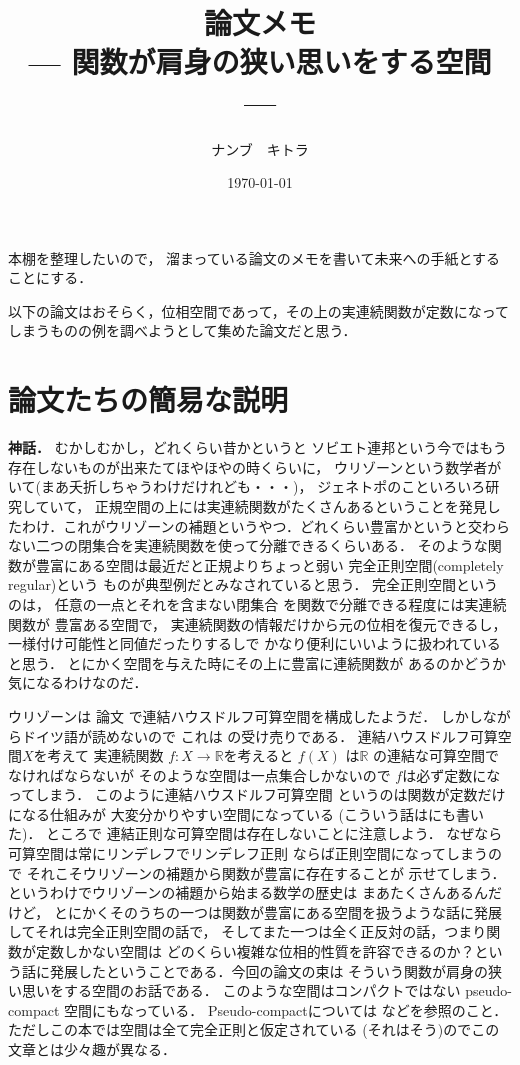 \documentclass[leqno, a4paper, 12pt]{jsarticle}
\title{論文メモ
\large{\\--- 関数が肩身の狭い思いをする空間 ---}
}
\author{ナンブ　キトラ}
\date{\today}
\newcommand{\rr}{\mathbb{R}}
\begin{document}
\maketitle

本棚を整理したいので，
溜まっている論文のメモを書いて未来への手紙とすることにする．

以下の論文はおそらく，位相空間であって，その上の実連続関数が定数になってしまうものの例を調べようとして集めた論文だと思う．
\section{論文たちの簡易な説明}
\textbf{神話．}
むかしむかし，どれくらい昔かというと
ソビエト連邦という今ではもう存在しないものが出来たてほやほやの時くらいに，
ウリゾーンという数学者がいて(まあ夭折しちゃうわけだけれども・・・)，
ジェネトポのこといろいろ研究していて，
正規空間の上には実連続関数がたくさんあるということを発見したわけ．これがウリゾーンの補題というやつ．どれくらい豊富かというと交わらない二つの閉集合を実連続関数を使って分離できるくらいある．
そのような関数が豊富にある空間は最近だと正規よりちょっと弱い
完全正則空間(completely regular)という
ものが典型例だとみなされていると思う．
完全正則空間というのは，
任意の一点とそれを含まない閉集合
を関数で分離できる程度には実連続関数が
豊富ある空間で，
実連続関数の情報だけから元の位相を復元できるし，
一様付け可能性と同値だったりするしで
かなり便利にいいように扱われていると思う．
とにかく空間を与えた時にその上に豊富に連続関数が
あるのかどうか気になるわけなのだ．

ウリゾーンは
論文
\cite{MR1512258}
で連結ハウスドルフ可算空間を構成したようだ．
しかしながらドイツ語が読めないので
これは
\cite{MR0017527}
の受け売りである．
連結ハウスドルフ可算空間$X$を考えて
実連続関数
$f\colon X\to \rr$を考えると
$f(X)$
は$\rr$
の連結な可算空間でなければならないが
そのような空間は一点集合しかないので
$f$は必ず定数になってしまう．
このように連結ハウスドルフ可算空間
というのは関数が定数だけになる仕組みが
大変分かりやすい空間になっている
(こういう話は\cite{Den1}にも書いた)．
ところで
連結正則な可算空間は存在しないことに注意しよう．
なぜなら
可算空間は常にリンデレフでリンデレフ正則
ならば正則空間になってしまうので
それこそウリゾーンの補題から関数が豊富に存在することが
示せてしまう．
というわけでウリゾーンの補題から始まる数学の歴史は
まあたくさんあるんだけど，
とにかくそのうちの一つは関数が豊富にある空間を扱うような話に発展してそれは完全正則空間の話で，
そしてまた一つは全く正反対の話，つまり関数が定数しかない空間は
どのくらい複雑な位相的性質を許容できるのか？という話に発展したということである．今回の論文の束は
そういう関数が肩身の狭い思いをする空間のお話である．
このような空間はコンパクトではない
pseudo-compact 空間にもなっている．
Pseudo-compactについては
\cite{MR3822332}などを参照のこと．
ただしこの本では空間は全て完全正則と仮定されている
(それはそう)のでこの文章とは少々趣が異なる．
\end{document}
